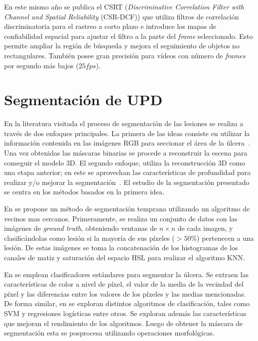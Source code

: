 En este mismo año se publica el CSRT (\textit{Discriminative Correlation Filter with Channel and Spatial Reliability} (CSR-DCF)) \cite{lunevzivc2018discriminative} que utiliza filtros de correlación discriminatoria para el rastreo a corto plazo e introduce los mapas de confiabilidad espacial para ajustar el filtro a la parte del \textit{frame} seleccionado. Esto permite ampliar la región de búsqueda y mejora el seguimiento de objetos no rectangulares. También posee gran precisión para vídeos con número de \textit{frames} por segundo más bajos ($25 fps$).

\section{Segmentación de UPD}

En la literatura visitada el proceso de segmentación de las lesiones se realiza  a través de dos enfoques principales. La primera de las ideas consiste en  utilizar la información contenida en las imágenes RGB para seccionar el área de la úlcera~\cite{mirzaalian2019measuring}. Una vez obtenidas las máscaras binarias  se procede a reconstruir la escena para conseguir el modelo 3D. El segundo enfoque, utiliza la reconstrucción 3D como una etapa anterior; en este se aprovechan las características de profundidad para realizar y/o mejorar la segmentación~\cite{filko2018wound}. El estudio de la segmentación presentado se centra en los métodos basados en la primera idea.

En \cite{filko2018wound} se propone un método de segmentación temprana utilizando un algoritmo de vecinos mas cercanos.  Primeramente, se realiza un conjunto de datos con las imágenes de \textit{ground truth}, obteniendo ventanas de $n \times n$ de cada imagen, y clasificándolas como lesión si la mayoría de sus píxeles ($> 50 \%$) pertenecen a una lesión. De estas imágenes se toma la concatenación de los histogramas de los canales de matiz y saturación del espacio HSL para realizar el algoritmo KNN.

En \cite{seixas2015pattern} se emplean clasificadores estándares para segmentar la úlcera. Se extraen las características de color a nivel de píxel, el valor de la media de la vecindad del píxel y las diferencias entre los valores de los píxeles y las medias mencionadas. De forma similar, en \cite{heras2022diabetic} se exploran distintos algoritmos de clasificación, tales como SVM y regresiones logísticas entre otros. Se exploran además las características que mejoran el rendimiento de los algoritmos. Luego de obtener la máscara de segmentación esta se posprocesa utilizando operaciones morfológicas.

